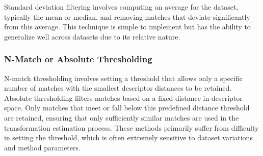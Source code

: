 Standard deviation filtering involves computing an average for the dataset, typically the mean or median, and removing matches that deviate significantly from this average. This technique is simple to implement but has the ability to generalize well across datasets due to its relative nature. 

\subsubsection{N-Match or Absolute Thresholding}
N-match thresholding involves setting a threshold that allows only a specific number of matches with the smallest descriptor distances to be retained. Absolute thresholding filters matches based on a fixed distance in descriptor space. Only matches that meet or fall below this predefined distance threshold are retained, ensuring that only sufficiently similar matches are used in the transformation estimation process. These methods primarily suffer from difficulty in setting the threshold, which is often extremely sensitive to dataset variations and method parameters.

